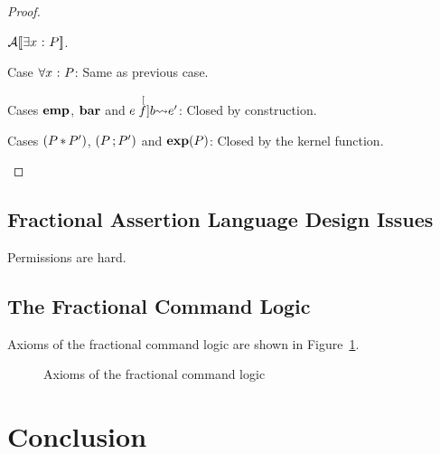 \documentclass[11pt]{report}
\begin{document}
\begin{proof}
\begin{description}
{			$\mathcal{A}[\![\exists x \operatorname{\,:\,} P]\!]$.
		
		}
		
		\item{Case $\forall x \operatorname{\,:\,} P$:} Same as previous case. 
		
		\item{Cases $\operatorname{\mathbf{emp}}$, $\operatorname{\mathbf{bar}}$ and $e \stackrel[f]{b}{\leadsto} e'$:} Closed by construction.
		
		\item{Cases $(P \operatorname{\ast} P')$, $(P \operatorname{;} P')$ and $\operatorname{\mathbf{exp}}(P)$:} Closed by the kernel function. 
		
	\end{description}
	
\end{proof}



\section{Fractional Assertion Language Design Issues} %
\label{sec:fractional_assertion_language_design_issues}

Permissions are hard. 



\section{The Fractional Command Logic} %
\label{sec:the_command_logic}

Axioms of the fractional command logic are shown in Figure~\ref{fig:fractional-command-logic-axioms}.
\begin{figure}[h]
	\centering
	
		
		\vspace{1em}
	
		
		\vspace{1em}
	
		
		\vspace{1em}
	
		
		
	\caption{Axioms of the fractional command logic}
	\label{fig:fractional-command-logic-axioms}
\end{figure}


\chapter{Conclusion}

 
\end{document}
